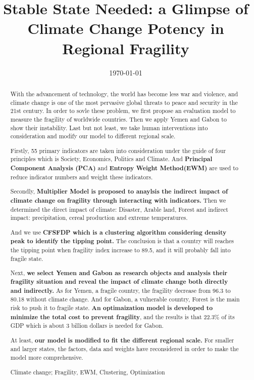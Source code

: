 \documentclass{mcmthesis}
\title{Stable State Needed: a Glimpse of Climate Change Potency in Regional Fragility}
\author{}
\date{\today}
\begin{document}
	\begin{abstract}
		
		With the advancement of technology, the world has become less war and violence, and climate change is one of the most pervasive global threats to peace and security in the 21st century. In order to sovle these problem, we first propose an evaluation model to measure the fragility of worldwide countries. Then we apply Yemen and Gabon to show their instability. Last but not least, we take human interventions into consideration and modify our model to different regional scale.
		
		Firstly, 55 primary indicators are taken into consideration under the guide of four principles which is Society, Economics, Politics and Climate. And \textbf{Principal Component Analysis (PCA)} and \textbf{Entropy Weight Method(EWM)} are used to reduce indicator numbers and weight these indicators.
		
		Secondly, \textbf{Multiplier Model is proposed to anaylsis the indirect impact of climate change on fragility through interacting with indicators.} Then we determined the direct impact of climate: Disaster, Arable land, Forest and indirect impact: precipitation, cereal production and extreme temperatures.
		
		And we use \textbf{CFSFDP which is a clustering algorithm considering density peak to identify the tipping point.} The conclusion is that a country will reaches the tipping point when fragility index increase to 89.5, and it will probably fall into fragile state.
		
		Next, \textbf{we select Yemen and Gabon as research objects and analysis their fragility situation and reveal the impact of climate change both directly and indirectly.} As for Yemen, a fragile country, the fragility decrease from 96.3 to 80.18 without climate change. And for Gabon, a vulnerable country, Forest is the main risk to push it to fragile state. \textbf{An optimaization model is developed to minimize the total cost to prevent fragility}, and the results is that 22.3\% of its GDP which is about 3 billion dollars is needed for Gabon.
		
		At least, \textbf{our model is modified to fit the different regional scale.} For smaller and larger states, the factors, data and weights have reconsidered in order to make the model more comprehensive.
		
		
		
		\begin{keywords}
			Climate change; Fragility, EWM, Clustering, Optimization 
		\end{keywords}
	\end{abstract}
\end{document}
